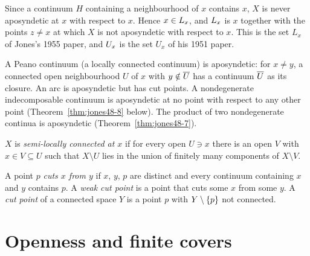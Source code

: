 
Since a continuum $H$ containing a neighbourhood of $x$ contains $x$, $X$ is never aposyndetic at $x$
with respect to $x$. Hence $x\in L_{x}$, and $L_{x}$ is $x$ together with the points $z\ne x$ at which $X$
is not aposyndetic with respect to $x$. This is the set $L_x$ of Jones's 1955 paper, and $U_{x}$ is the
set $U_x$ of his 1951 paper.

\begin{example}\label{ex:apos}
A Peano continuum (a locally connected continuum) is aposyndetic: for $x\ne y$, a connected open
neighbourhood $U$ of $x$ with $y\notin\overline{U}$ has a continuum $\overline{U}$ as its closure. An arc is
aposyndetic but has cut points. A nondegenerate indecomposable continuum is aposyndetic at no point with
respect to any other point (Theorem~\ref{thm:jones48-8} below). The product of two nondegenerate
continua is aposyndetic (Theorem~\ref{thm:jones48-7}).
\end{example}

\begin{definition}\label{def:slc}
$X$ is \emph{semi-locally connected at $x$} if for every open $U\ni x$ there is an open $V$ with
$x\in V\subseteq U$ such that $X\setminus U$ lies in the union of finitely many components of $X\setminus V$.
\end{definition}


\begin{definition}\label{def:cuts}
A point $p$ \emph{cuts $x$ from $y$} if $x$, $y$, $p$ are distinct and every continuum containing $x$ and
$y$ contains $p$. A \emph{weak cut point} is a point that cuts some $x$ from some $y$. A \emph{cut point} of
a connected space $Y$ is a point $p$ with $Y\setminus\left\{ p \right\}$ not connected.
\end{definition}


\section{Openness and finite covers}

